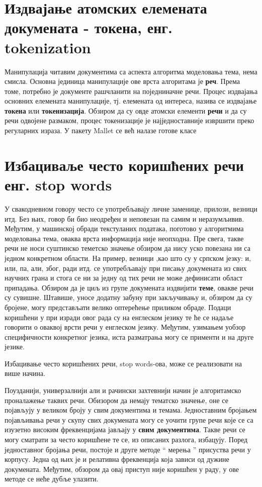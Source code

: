 \section{Издвајање атомских елемената докумената - токена, енг. tokenization}

Манипулација читавим документима са аспекта алгоритма моделовања тема, нема смисла. Основна јединица манипулације ове врста алгоритама је \textbf{реч}.  Према томе, потребно је документе рашчланити на поједниначне речи. Процес издвајања основних елемената манипулације, тј. елемената од интереса, назива се издвајање \textbf{токена} или \textbf{токенизација}. Обзиром да су овде атомски елементи \textbf{речи} и да су речи одвојене размаком, процес токенизације је најједноставније извршити преко регуларних израза. 
У пакету Mallet се већ налазе готове класе  

	\section{Избациваље често коришћених речи енг. stop words}
		
У свакодневном говору често се употребљавају личне заменице, прилози, везници итд. Без њих, говор би био неодређен и неповезан па самим и неразумљивив. Међутим, у машинској обради текстуланих података, поготово у алгоритмима моделовања тема, оваква врста информација није неопходна. Пре свега, такве  речи не носи суштинско теметско значење обзиром да нису уско повезана ни са једном конкретном области. На пример, везници ,као што су у српском језку: и, или, па, али, због, ради итд. се употребљавају при писању докумената из свих научних грана и стога се ни за једну од тих речи не може дефинисати област припадања. Обзиром да је циљ из групе докумената издвијити \textbf{теме}, овакве речи су сувишне. Штавише, уносе додатну забуну при закључивању и, обзиром да су бројене, могу представљати велико оптерећење приликом обраде.	
Подаци коришћени у при изради овог рада су на енглеском језику те ће се надаље говорити о оваквој врсти речи у енглеском језику. Међутим, узимањем уобзор специфичности конкретног језика, иста разматрања могу се применти и на друге језике.

Избацивање често коришћених речи, stop words-ова, може се реализовати на више начина. 

Поузданији, универзалнији али и рачински захтевнији начин је алгоритамско проналажење таквих речи. Обизором да немају тематско значење, оне се појављују у великом броју у свим документима и темама. Једноставним бројањем појављивања речи у скупу свих докумената могу се уочити групе речи које се са изузетно високим фреквенцијама јављају у \textbf{свим документима}. Такве речи се могу сматрати за често коришћене те се, из описаних разлога, избацују.  Поред једноставног бројања речи, постоје и друге методе "` мерења "' присуства речи у корпусу. Једна од њих је и релативна фреквенција која зависи од дужине докумената. Међутим, обзором да овај приступ није коришћен у раду, у ове методе се неће дубље улазити.

